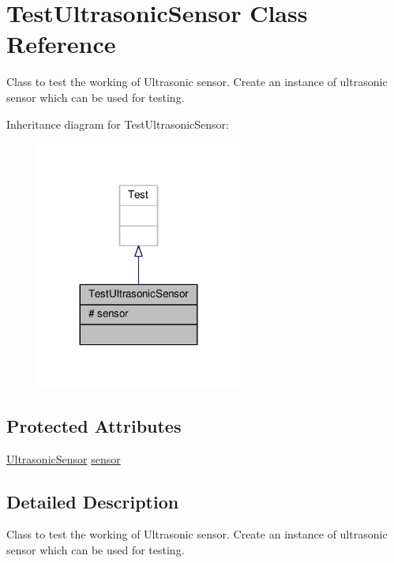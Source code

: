 \hypertarget{class_test_ultrasonic_sensor}{}\section{Test\+Ultrasonic\+Sensor Class Reference}
\label{class_test_ultrasonic_sensor}


Class to test the working of Ultrasonic sensor. Create an instance of ultrasonic sensor which can be used for testing.  




Inheritance diagram for Test\+Ultrasonic\+Sensor\+:
\nopagebreak
\begin{figure}[H]
\begin{center}
\leavevmode
\includegraphics[width=191pt]{class_test_ultrasonic_sensor__inherit__graph}
\end{center}
\end{figure}
\subsection*{Protected Attributes}
\begin{DoxyCompactItemize}
\item 
\hyperlink{class_ultrasonic_sensor}{Ultrasonic\+Sensor} \hyperlink{class_test_ultrasonic_sensor_abaaead54c0ad8a32f353b38b2f84127a}{sensor}
\end{DoxyCompactItemize}


\subsection{Detailed Description}
Class to test the working of Ultrasonic sensor. Create an instance of ultrasonic sensor which can be used for testing. 

